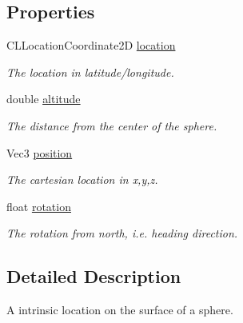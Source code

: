 \subsection*{Properties}
\begin{DoxyCompactItemize}
\item 
\hypertarget{interface_a_r_world_location_a433d62d8d53e8c6004b18f0a4ced7420}{
CLLocationCoordinate2D \hyperlink{interface_a_r_world_location_a433d62d8d53e8c6004b18f0a4ced7420}{location}}
\label{interface_a_r_world_location_a433d62d8d53e8c6004b18f0a4ced7420}

\begin{DoxyCompactList}\small\item\em The location in latitude/longitude. \end{DoxyCompactList}\item 
\hypertarget{interface_a_r_world_location_a433183faaa54db70be30a6367eab070f}{
double \hyperlink{interface_a_r_world_location_a433183faaa54db70be30a6367eab070f}{altitude}}
\label{interface_a_r_world_location_a433183faaa54db70be30a6367eab070f}

\begin{DoxyCompactList}\small\item\em The distance from the center of the sphere. \end{DoxyCompactList}\item 
\hypertarget{interface_a_r_world_location_a51ba96d39c18d08b5fc9df1d30c99bb8}{
Vec3 \hyperlink{interface_a_r_world_location_a51ba96d39c18d08b5fc9df1d30c99bb8}{position}}
\label{interface_a_r_world_location_a51ba96d39c18d08b5fc9df1d30c99bb8}

\begin{DoxyCompactList}\small\item\em The cartesian location in x,y,z. \end{DoxyCompactList}\item 
\hypertarget{interface_a_r_world_location_a9666c2204abf7340a81f46ab97853a24}{
float \hyperlink{interface_a_r_world_location_a9666c2204abf7340a81f46ab97853a24}{rotation}}
\label{interface_a_r_world_location_a9666c2204abf7340a81f46ab97853a24}

\begin{DoxyCompactList}\small\item\em The rotation from north, i.e. heading direction. \end{DoxyCompactList}\end{DoxyCompactItemize}


\subsection{Detailed Description}
A intrinsic location on the surface of a sphere. 

